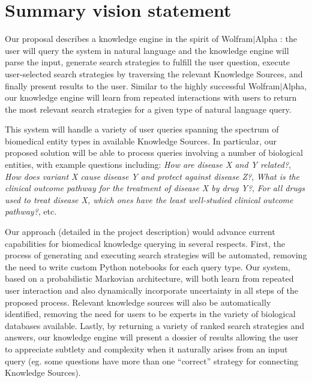 \documentclass[11pt,notitlepage]{article}
\begin{document}
\thispagestyle{plain}

\section{Summary vision statement}
\setlength{\parskip}{4pt} Our proposal describes a knowledge engine in the
spirit of Wolfram$|$Alpha \cite{Wolframalpha}: the user will query the system in
natural language and the knowledge engine will parse the input, generate search
strategies to fulfill the user question, execute user-selected search strategies
by traversing the relevant Knowledge Sources, and finally present results to the
user. Similar to the highly successful Wolfram$|$Alpha, our knowledge engine
will learn from repeated interactions with users to return the most relevant
search strategies for a given type of natural language query.

This system will handle a variety of user queries spanning the spectrum of
biomedical entity types in available Knowledge Sources. In
particular, our proposed solution will be able to process queries involving a
number of biological entities, with example questions including: \textit{How are
  disease X and Y related?}, \textit{How does variant X cause disease Y and
  protect against disease Z?}, \textit{What is the clinical outcome pathway for
  the treatment of disease X by drug Y?}, \textit{For all drugs used to treat
  disease X, which ones have the least well-studied clinical outcome pathway?},
etc.

Our approach (detailed in the project description) would advance current
capabilities for biomedical knowledge querying in several respects. First, the
process of generating and executing search strategies will be automated,
removing the need to write custom Python notebooks for each query type. Our
system, based on a probabilistic Markovian architecture, will both learn from
repeated user interaction and also dynamically incorporate uncertainty in all
steps of the proposed process. Relevant knowledge sources will also be
automatically identified, removing the need for users to be experts in the
variety of biological databases available. Lastly, by returning a variety of
ranked search strategies and answers, our knowledge engine will present a
dossier of results allowing the user to appreciate subtlety and complexity when
it naturally arises from an input query (eg. some questions have more than one
``correct'' strategy for connecting Knowledge Sources).
\end{document}

